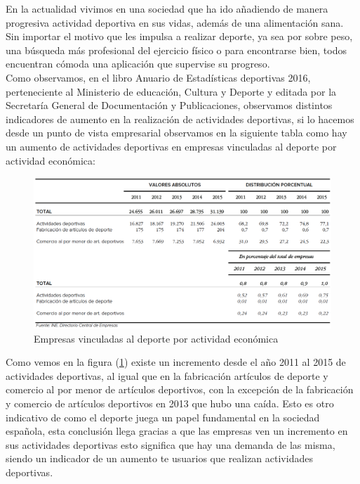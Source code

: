 \documentclass[a4paper, 11pt]{article}
\begin{document}

      En la actualidad vivimos en una sociedad que ha ido añadiendo de manera
      progresiva actividad deportiva en sus vidas, además de una alimentación sana. Sin
      importar el motivo que les impulsa a realizar deporte, ya sea por sobre
      peso, una búsqueda más profesional del ejercicio físico o para encontrarse
      bien, todos encuentran cómoda una aplicación que supervise su progreso. \\

      Como observamos, en el libro Anuario de Estadísticas deportivas 2016,
      perteneciente al Ministerio de educación, Cultura y Deporte y editada por
      la Secretaría General de Documentación y Publicaciones, observamos
      distintos indicadores de aumento en la realización de actividades
      deportivas, si lo hacemos desde un punto de vista empresarial observamos
      en la siguiente tabla como hay un aumento de actividades deportivas en
      empresas vinculadas al deporte por actividad económica:\\

      \begin{figure}[H]
          \centering
          \includegraphics[width=1\textwidth]{empresas-vinculadas-al-deporte-por-actividad-economica}
          \caption{Empresas vinculadas al deporte por actividad económica}
          \label{f:empresas}
      \end{figure}

      Como vemos en la figura (\ref{f:empresas}) existe un incremento desde el
      año 2011 al 2015 de actividades deportivas, al igual que en la fabricación
      artículos de deporte y comercio al por menor de artículos deportivos,
      con la excepción de la fabricación y comercio de artículos deportivos en
      2013 que hubo una caída. Esto es otro indicativo de como el deporte juega
      un papel fundamental en la sociedad española, esta conclusión llega
      gracias a que las empresas ven un incremento en sus actividades deportivas
      esto significa que hay una demanda de las misma, siendo un indicador de
      un aumento te usuarios que realizan actividades deportivas.\\
\end{document}
